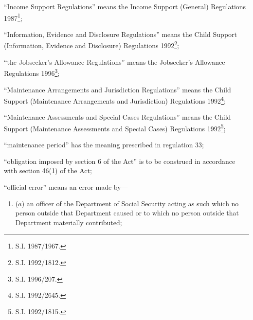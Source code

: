 \documentclass[a4paper,12pt]{article}
\begin{document}
\begin{enumerate}
“Income Support Regulations” means the Income Support (General) Regulations 1987\footnote{\frenchspacing S.I. 1987/1967.};

“Information, Evidence and Disclosure Regulations” means the Child Support (Information, Evidence and Disclosure) Regulations 1992\footnote{\frenchspacing S.I. 1992/1812.};

\begin{sloppypar}
“the Jobseeker’s Allowance Regulations” means the Jobseeker’s Allowance Regulations 1996\footnote{\frenchspacing S.I. 1996/207.};
\end{sloppypar}

“Maintenance Arrangements and Jurisdiction Regulations” means the Child Support (Maintenance Arrangements and Jurisdiction) Regulations 1992\footnote{\frenchspacing S.I. 1992/2645.};

“Maintenance Assessments and Special Cases Regulations” means the Child Support (Maintenance Assessments and Special Cases) Regulations 1992\footnote{\frenchspacing S.I. 1992/1815.};

“maintenance period” has the meaning prescribed in regulation 33;

“obligation imposed by section 6 of the Act” is to be construed in accordance with section 46(1) of the Act;


“official error” means an error made by—
\begin{enumerate}\item[]
    ($a$) 
    an officer of the Department of Social Security acting as such which no person outside that Department caused or to which no person outside that Department materially contributed;




\end{enumerate}
\end{enumerate}
\end{document}
